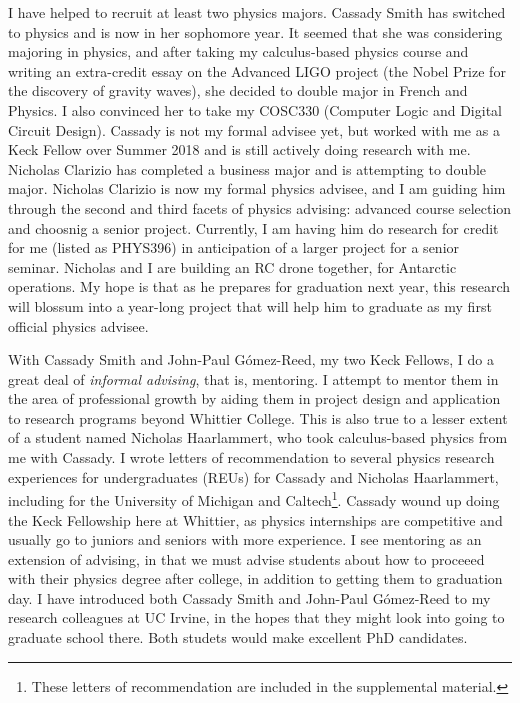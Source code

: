 \documentclass[../main.tex]{subfiles}
\begin{document}
I have helped to recruit at least two physics majors.  Cassady Smith has switched to physics and is now in her sophomore year.  It seemed that she was considering majoring in physics, and after taking my calculus-based physics course and writing an extra-credit essay on the Advanced LIGO project (the Nobel Prize for the discovery of gravity waves), she decided to double major in French and Physics.  I also convinced her to take my COSC330 (Computer Logic and Digital Circuit Design).  Cassady is not my formal advisee yet, but worked with me as a Keck Fellow over Summer 2018 and is still actively doing research with me.  Nicholas Clarizio has completed a business major and is attempting to double major.  Nicholas Clarizio is now my formal physics advisee, and I am guiding him through the second and third facets of physics advising: advanced course selection and choosnig a senior project.  Currently, I am having him do research for credit for me (listed as PHYS396) in anticipation of a larger project for a senior seminar.  Nicholas and I are building an RC drone together, for Antarctic operations.  My hope is that as he prepares for graduation next year, this research will blossum into a year-long project that will help him to graduate as my first official physics advisee. \\ \hspace{0.1cm}

With Cassady Smith and John-Paul G\'{o}mez-Reed, my two Keck Fellows, I do a great deal of \textit{informal advising}, that is, mentoring.  I attempt to mentor them in the area of professional growth by aiding them in project design and application to research programs beyond Whittier College.  This is also true to a lesser extent of a student named Nicholas Haarlammert, who took calculus-based physics from me with Cassady.  I wrote letters of recommendation to several physics research experiences for undergraduates (REUs) for Cassady and Nicholas Haarlammert, including for the University of Michigan and Caltech\footnote{These letters of recommendation are included in the supplemental material.}.  Cassady wound up doing the Keck Fellowship here at Whittier, as physics internships are competitive and usually go to juniors and seniors with more experience.  I see mentoring as an extension of advising, in that we must advise students about how to proceeed with their physics degree after college, in addition to getting them to graduation day.  I have introduced both Cassady Smith and John-Paul G\'{o}mez-Reed to my research colleagues at UC Irvine, in the hopes that they might look into going to graduate school there.  Both studets would make excellent PhD candidates.
\end{document}
